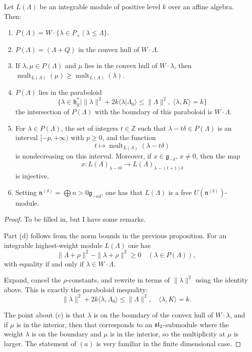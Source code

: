 \documentclass[12pt]{article}
\begin{document}
\begin{proposition}
    Let $L(\Lambda)$ be an integrable module of positive level $k$ over an affine algebra. Then:
    \begin{enumerate}[label=\text{(\alph*)}]
        \item $P(\Lambda) = W \cdot \{ \lambda \in P_+ \mid \lambda \le \Lambda \}$.
        \item $P(\Lambda) = (\Lambda + Q)$ in the convex hull of $W \cdot \Lambda$.
        \item If $\lambda, \mu \in P(\Lambda)$ and $\mu$ lies in the convex hull of $W \cdot \lambda$, then
              $\operatorname{mult}_{L(\Lambda)}(\mu) \ge \operatorname{mult}_{L(\Lambda)}(\lambda)$.
        \item $P(\Lambda)$ lies in the paraboloid
              \[\{ \lambda \in \mathfrak{h}^*_\mathbb{R} \mid \| \lambda \|^2 + 2k\langle \lambda | \Lambda_0 \rangle \le \| \Lambda \|^2, \; \langle \lambda, K \rangle = k \}\]
              the intersection of $P(\Lambda)$ with the boundary of this paraboloid is $W \cdot \Lambda$.
        \item For $\lambda \in P(\Lambda)$, the set of integers $t \in \mathbb{Z}$ such that $\lambda - t\delta \in P(\Lambda)$ is an interval $[-p, +\infty)$ with $p \ge 0$, and the function
              \[
                  t \longmapsto \operatorname{mult}_{L(\Lambda)}(\lambda - t\delta)
              \]
              is nondecreasing on this interval. Moreover, if $x \in \mathfrak{g}_{-\delta}$, $x \neq 0$, then the map
              \[x : L(\Lambda)_{\lambda - t\delta} \longrightarrow L(\Lambda)_{\lambda - (t+1)\delta}\]
              is injective.
        \item Setting $\mathfrak{n}^{(\delta)} = \bigoplus{n>0} \mathfrak{g}_{-n\delta}$, one has that $L(\Lambda)$ is a free $U(\mathfrak{n}^{(\delta)})$-module.
    \end{enumerate}
\end{proposition}

\begin{proof}
    To be filled in, but I have some remarks.

    Part (d) follows from the norm bounds in the previous proposition. For an integrable highest-weight module $L(\Lambda)$ one has
    \[
        \|\Lambda+\rho\|^2-\|\lambda+\rho\|^2 \geq 0 \quad (\lambda\in P(\Lambda)),
    \]
    with equality if and only if $\lambda\in W\cdot\Lambda$.

    Expand, cancel the $\rho$-constants, and rewrite in terms of $\|\lambda\|^2$ using the identity above. This is exactly the paraboloid inequality:
    \[
        \|\lambda\|^2+2k\langle\lambda,\Lambda_0\rangle \leq \|\Lambda\|^2, \quad \langle\lambda,K\rangle=k.
    \]

    The point about (c) is that $\lambda$ is on the boundary of the convex hull of $W\cdot\lambda$, and if $\mu$ is in the interior, then that corresponds to an $\sl_2$-submodule where the weight $\lambda$ is on the boundary and $\mu$ is in the interior, so the multiplicity at $\mu$ is larger. The statement of $(a)$ is very familiar in the finite dimensional case.
\end{proof}
\end{document}
